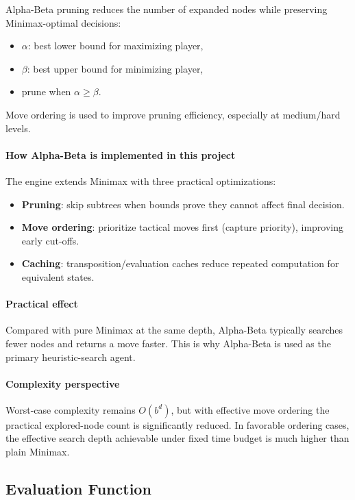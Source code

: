\documentclass[a4paper,12pt]{article}
\begin{document}
Alpha-Beta pruning reduces the number of expanded nodes while preserving Minimax-optimal decisions:
\begin{itemize}
    \item $\alpha$: best lower bound for maximizing player,
    \item $\beta$: best upper bound for minimizing player,
    \item prune when $\alpha \ge \beta$.
\end{itemize}

Move ordering is used to improve pruning efficiency, especially at medium/hard levels.

  \paragraph{How Alpha-Beta is implemented in this project}
  The engine extends Minimax with three practical optimizations:
  \begin{itemize}
    \item \textbf{Pruning}: skip subtrees when bounds prove they cannot affect final decision.
    \item \textbf{Move ordering}: prioritize tactical moves first (capture priority), improving early cut-offs.
    \item \textbf{Caching}: transposition/evaluation caches reduce repeated computation for equivalent states.
  \end{itemize}

  \paragraph{Practical effect}
  Compared with pure Minimax at the same depth, Alpha-Beta typically searches fewer nodes and returns a move faster. This is why Alpha-Beta is used as the primary heuristic-search agent.

  \paragraph{Complexity perspective}
  Worst-case complexity remains $O(b^d)$, but with effective move ordering the practical explored-node count is significantly reduced. In favorable ordering cases, the effective search depth achievable under fixed time budget is much higher than plain Minimax.

\subsection{Evaluation Function}
\end{document}
